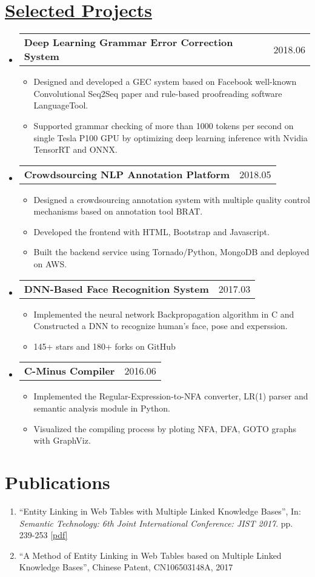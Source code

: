 \documentclass[letterpaper, 11pt]{article}
\makeatletter
\newcommand{\resumeSingleSubItem}[1]{
   \item\small{#1} \vspace{-3pt}
}
\newcommand{\projectSubheading}[2]{
  \vspace{-2pt}\item
    \begin{tabular*}{0.97\textwidth}[t]{l@{\extracolsep{\fill}}r}
      \textbf{#1} & #2 \\
    \end{tabular*}\vspace{-7pt}
}
\newcommand{\resumeSubHeadingListStart}{\begin{itemize}[leftmargin=*]}
\newcommand{\resumeSubHeadingListEnd}{\end{itemize}\vspace{-9.6pt}}
\newcommand{\resumeItemListStart}{\begin{itemize}[leftmargin=*]}
\newcommand{\resumeItemListEnd}{\end{itemize}\vspace{-5pt}}
\makeatother
\begin{document}
\section{\href{https://yanshengjia.com/projects}{Selected Projects}}
    \resumeSubHeadingListStart
        \projectSubheading{Deep Learning Grammar Error Correction System}{2018.06}
          \resumeItemListStart
            \resumeSingleSubItem{Designed and developed a GEC system based on Facebook well-known Convolutional Seq2Seq paper and rule-based proofreading software LanguageTool.}
            \resumeSingleSubItem{Supported grammar checking of more than 1000 tokens per second on single Tesla P100 GPU by optimizing deep learning inference with Nvidia TensorRT and ONNX.}
          \resumeItemListEnd
            
        \projectSubheading{Crowdsourcing NLP Annotation Platform}{2018.05}
          \resumeItemListStart
            \resumeSingleSubItem{Designed a crowdsourcing annotation system with multiple quality control mechanisms based on annotation tool BRAT.}
            \resumeSingleSubItem{Developed the frontend with HTML, Bootstrap and Javascript.}
            \resumeSingleSubItem{Built the backend service using Tornado/Python, MongoDB and deployed on AWS.}
          \resumeItemListEnd

        \projectSubheading{DNN-Based Face Recognition System}{2017.03}
          \resumeItemListStart
            \resumeSingleSubItem{Implemented the neural network Backpropagation algorithm in C and Constructed a DNN to recognize human's face, pose and experssion.}
            \resumeSingleSubItem{145+ stars and 180+ forks on GitHub}
          \resumeItemListEnd

        \projectSubheading{C-Minus Compiler}{2016.06}
          \resumeItemListStart
            \resumeSingleSubItem{Implemented the Regular-Expression-to-NFA converter, LR(1) parser and semantic analysis module in Python.}
            \resumeSingleSubItem{Visualized the compiling process by ploting NFA, DFA, GOTO graphs with GraphViz.}
          \resumeItemListEnd

    \resumeSubHeadingListEnd


\section{Publications}
    \begin{enumerate}[leftmargin=*, itemsep=0pt]
        \resumeSingleSubItem{``Entity Linking in Web Tables with Multiple Linked Knowledge Bases'', In: \textit{Semantic Technology: 6th Joint International Conference: JIST 2017}. pp. 239-253 \href{https://link.springer.com/chapter/10.1007/978-3-319-50112-3_18}{[pdf]}}
        \resumeSingleSubItem{``A Method of Entity Linking in Web Tables based on Multiple Linked Knowledge Bases'', Chinese Patent, CN106503148A, 2017} 
    \end{enumerate}\vspace{-10pt}
\end{document}
